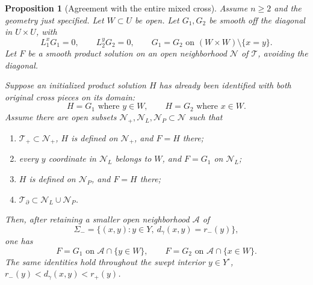 \documentclass[11pt]{article}
\newtheorem{proposition}[theorem]{Proposition}
\theoremstyle{definition}
\theoremstyle{remark}
\numberwithin{equation}{section}
\begin{document}
\begin{proposition}[Agreement with the entire mixed cross]
\label{cross-repairs:slice}
Assume $n\ge2$ and the geometry just specified. Let $W\subset U$ be
open. Let $G_1,G_2$ be smooth off the diagonal in $U\times U$, with
\[
 L_1^xG_1=0,\qquad L_2^yG_2=0,\qquad
 G_1=G_2\text{ on }(W\times W)\setminus\{x=y\}.
\]
Let $F$ be a smooth product solution on an open neighborhood
$\mathcal N$ of $\mathcal T$, avoiding the diagonal.

Suppose an initialized product solution $H$ has already been identified
with both original cross pieces on its domain:
\[
 H=G_1\text{ where }y\in W,\qquad
 H=G_2\text{ where }x\in W.
\]
Assume there are open subsets
$\mathcal N_+,\mathcal N_L,\mathcal N_P\subset\mathcal N$ such that
\begin{enumerate}
 \item $\mathcal T_+\subset\mathcal N_+$, $H$ is defined on
       $\mathcal N_+$, and $F=H$ there;
 \item every $y$ coordinate in $\mathcal N_L$ belongs to $W$, and
       $F=G_1$ on $\mathcal N_L$;
 \item $H$ is defined on $\mathcal N_P$, and $F=H$ there;
 \item $\mathcal T_\partial\subset\mathcal N_L\cup\mathcal N_P$.
\end{enumerate}
Then, after retaining a smaller open neighborhood $\mathcal A$ of
\[
 \Sigma_- =\{(x,y):y\in Y,
                        \ d_\gamma(x,y)=r_-(y)\},
\]
one has
\begin{equation}\label{cross-repairs:full-match}
 F=G_1\text{ on }\mathcal A\cap\{y\in W\},\qquad
 F=G_2\text{ on }\mathcal A\cap\{x\in W\}.
\end{equation}
The same identities hold throughout the swept interior
$y\in Y^\circ$, $r_-(y)<d_\gamma(x,y)<r_+(y)$.
\end{proposition}
\end{document}
